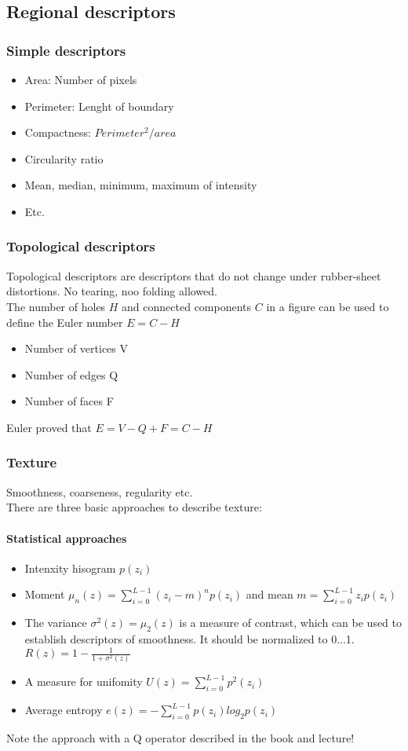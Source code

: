 \subsection{Regional descriptors}
\subsubsection{Simple descriptors}
\begin{itemize}
\item Area: Number of pixels
\item Perimeter: Lenght of boundary
\item Compactness: $Perimeter^2/area$
\item Circularity ratio
\item Mean, median, minimum, maximum of intensity
\item Etc.
\end{itemize}
\subsubsection{Topological descriptors}
Topological descriptors are descriptors that do not change under rubber-sheet distortions. No tearing, noo folding allowed.\\
The number of holes $H$ and connected components $C$ in a figure can be used to define the Euler number $E=C-H$\\
\begin{itemize}
\item Number of vertices V
\item Number of edges Q
\item Number of faces F
\end{itemize}
Euler proved that $E=V-Q+F=C-H$
\subsubsection{Texture}
Smoothness, coarseness, regularity etc.\\
There are three basic approaches to describe texture:\\
\paragraph{Statistical approaches}
\begin{itemize}
\item Intenxity hisogram $p(z_i)$
\item Moment $\mu_n(z)=\sum\limits_{i=0}^{L-1}(z_i-m)^np(z_i)$ and mean $m=\sum\limits_{i=0}^{L-1}z_ip(z_i)$
\item The variance $\sigma ^2(z) =\mu_2 (z)$ is a measure of contrast, which can be used to establish descriptors of smoothness. It should be normalized to 0...1. $R(z)=1-\frac{1}{1+\sigma ^2(z)}$
\item A measure for unifomity $U(z)=\sum\limits_{i=0}^{L-1}p^2(z_i)$
\item Average entropy $e(z)=-\sum\limits_{i=0}^{L-1}p(z_i)log_2p(z_i)$
\end{itemize}
Note the approach with a Q operator described in the book and lecture!\\

